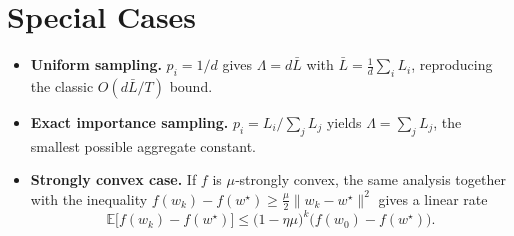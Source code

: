 \documentclass{article}
\newcommand{\E}{\mathbb{E}}
\begin{document}
\section*{Special Cases}
\begin{itemize}
\item \textbf{Uniform sampling.} $p_i=1/d$ gives $\Lambda = d\bar L$ with
$\bar L=\frac1d\sum_i L_i$, reproducing the classic $O(d\bar L/T)$ bound.
\item \textbf{Exact importance sampling.} $p_i = L_i/\sum_j L_j$ yields
$\Lambda = \sum_j L_j$, the smallest possible aggregate constant.
\item \textbf{Strongly convex case.} If $f$ is $\mu$‑strongly convex, the same
analysis together with the inequality
$f(w_k)-f(w^{\star})\ge \frac{\mu}{2}\|w_k-w^{\star}\|^{2}$
gives a linear rate
\[
\E\!\bigl[f(w_k)-f(w^{\star})\bigr]\le
\bigl(1-\eta\mu\bigr)^{k}\bigl(f(w_0)-f(w^{\star})\bigr).
\]
\end{itemize}
\end{document}
